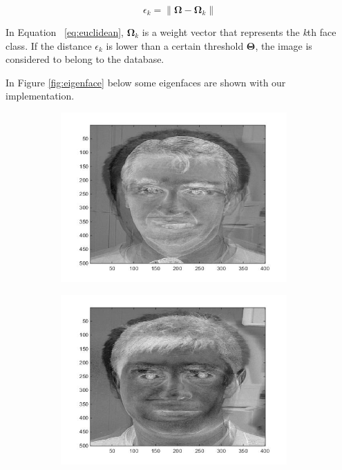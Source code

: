 \begin{equation}
\epsilon_k = \left \| \mathbf{\Omega} - \mathbf{\Omega}_k  \right \| 	
\label{eq:euclidean}
\end{equation}

	In Equation ~\ref{eq:euclidean}, $\mathbf{\Omega}_k$ is a weight vector that represents the \emph{k}th face class. If the distance $\epsilon_k$ is lower than a certain threshold $\mathbf{\Theta}$, the image is considered to belong to the database.

In Figure \ref{fig:eigenface} below some eigenfaces are shown with our implementation.

\begin{figure}[H]
\centering

\begin{subfigure}{.24\textwidth}
  \centering
  \includegraphics[width=0.95\textwidth]{img/fr/eigenface1.jpg}
  \caption{}
\end{subfigure}%
\begin{subfigure}{.24\textwidth}
  \centering
  \includegraphics[width=0.95\textwidth]{img/fr/eigenface2.jpg}

\end{subfigure}
\end{figure}
